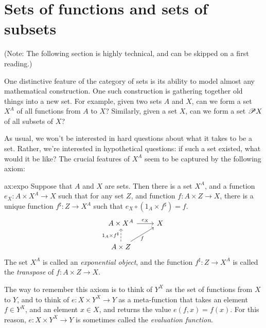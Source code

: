 






\section{Sets of functions and sets of subsets}

(Note: The following section is highly technical, and can be skipped
on a first reading.)

One distinctive feature of the category of sets is its ability to
model almost any mathematical construction.  One such construction is
gathering together old things into a new set.  For example, given two
sets $A$ and $X$, can we form a set $X^A$ of all functions from $A$ to
$X$?  Similarly, given a set $X$, can we form a set $\mathscr P X$ of all
subsets of $X$?

As usual, we won't be interested in hard questions about what it takes
to be a set.  Rather, we're interested in hypothetical questions: if
such a set existed, what would it be like?  The crucial features of
$X^A$ seem to be captured by the following axiom:



\begin{axi}{ax:expo} Suppose that $A$ and $X$ are
  sets.  Then there is a set $X^A$, and a function $e_X:A\times X^A\to
  X$ such that for any set $Z$, and function $f:A\times Z\to X$, there
  is a unique function $f^\sharp :Z\to X^A$ such that $e_X\circ
  (1_A\times f^\sharp )=f$.  \[ \begin{tikzcd}
    A\times X^A \arrow{r}{e_X} & X  \\
    A\times Z \arrow[dashed]{u}{1_A\times f^\sharp }
    \arrow{ur}[below]{f}
  \end{tikzcd} \] The set $X^A$ is called an \emph{exponential
    object}, and the function $f^\sharp :Z\to X^A$ is called the
  \emph{transpose} of $f:A\times Z\to X$.  \label{ax:expo}
\end{axi}


The way to remember this axiom is to think of $Y^X$ as the set of
functions from $X$ to $Y$, and to think of $e:X\times Y^X\to Y$ as a
meta-function that takes an element $f\in Y^X$, and an element $x\in
X$, and returns the value $e(f,x)=f(x)$.  For this reason, $e:X\times
Y^X\to Y$ is sometimes called the \emph{evaluation function}.

